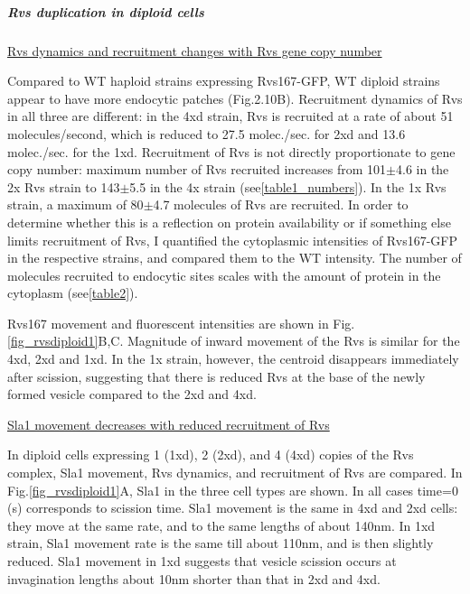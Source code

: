 		

		\subparagraph{Rvs duplication in diploid cells}
		\label{sub_rvsdiploids}
		
			 \underline{Rvs dynamics and recruitment changes with Rvs gene copy number}
			 
Compared to WT haploid strains expressing Rvs167-GFP, WT diploid strains appear to have more endocytic patches (Fig.2.10B). 
Recruitment dynamics of Rvs in all three are different: in the 4xd strain, Rvs is recruited at a rate of about 51 molecules/second, which is reduced to 27.5 molec./sec. for 2xd and 13.6 molec./sec. for the 1xd. Recruitment of Rvs is not directly proportionate to gene copy number: maximum number of Rvs recruited increases from 101$\pm$4.6 in the 2x Rvs strain to 143$\pm$5.5 in the 4x strain (see\ref{table1_numbers}). In the 1x Rvs strain, a maximum of 80$\pm$4.7 molecules of Rvs are recruited. In order to determine whether this is a reflection on protein availability or if something else limits recruitment of Rvs, I quantified the cytoplasmic intensities of Rvs167-GFP in the respective strains, and compared them to the WT intensity. The number of molecules recruited to endocytic sites scales with the amount of protein in the cytoplasm (see\ref{table2}).  

\vspace{5mm}
Rvs167 movement and fluorescent intensities are shown in Fig.\ref{fig_rvsdiploid1}B,C. 
Magnitude of inward movement of the Rvs is similar for the 4xd, 2xd and 1xd. In the 1x strain, however, the centroid disappears immediately after scission, suggesting that there is reduced Rvs at the base of the newly formed vesicle compared to the 2xd and 4xd.

\vspace{5mm}
\underline{Sla1 movement decreases with reduced recruitment of Rvs}

In diploid cells expressing 1 (1xd), 2 (2xd), and 4 (4xd) copies of the Rvs complex, Sla1 movement, Rvs dynamics, and recruitment of Rvs are compared. 
In Fig.\ref{fig_rvsdiploid1}A, Sla1 in the three cell types are shown. In all cases time=0 (s) corresponds to scission time. Sla1 movement is the same in 4xd and 2xd cells: they move at the same rate, and to the same lengths of about 140nm. In 1xd strain, Sla1 movement rate is the same till about 110nm, and is then slightly reduced. Sla1 movement in 1xd suggests that vesicle scission occurs at invagination lengths about 10nm shorter than that in 2xd and 4xd. 

